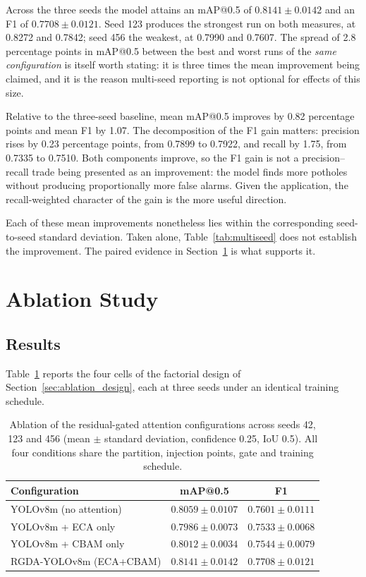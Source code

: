 \documentclass[MScCS]{uccthesis}
\begin{document}
Across the three seeds the model attains an mAP@0.5 of $0.8141 \pm 0.0142$ and
an F1 of $0.7708 \pm 0.0121$. Seed 123 produces the strongest run on both
measures, at 0.8272 and 0.7842; seed 456 the weakest, at 0.7990 and 0.7607. The
spread of 2.8 percentage points in mAP@0.5 between the best and worst runs of
the \emph{same configuration} is itself worth stating: it is three times the
mean improvement being claimed, and it is the reason multi-seed reporting is
not optional for effects of this size.

Relative to the three-seed baseline, mean mAP@0.5 improves by 0.82 percentage
points and mean F1 by 1.07. The decomposition of the F1 gain matters:
precision rises by 0.23 percentage points, from 0.7899 to 0.7922, and recall by
1.75, from 0.7335 to 0.7510. Both components improve, so the F1 gain is not a
precision--recall trade being presented as an improvement: the model finds
more potholes without producing proportionally more false alarms. Given the
application, the recall-weighted character of the gain is the more useful
direction.

Each of these mean improvements nonetheless lies within the corresponding
seed-to-seed standard deviation. Taken alone, Table~\ref{tab:multiseed} does
not establish the improvement. The paired evidence in
Section~\ref{sec:results_ablation} is what supports it.

\section{Ablation Study}
\label{sec:results_ablation}

\subsection{Results}

Table~\ref{tab:ablation} reports the four cells of the factorial design of
Section~\ref{sec:ablation_design}, each at three seeds under an identical
training schedule.

\begin{table}[tbp]
\centering
\small
\begin{tabular}{@{}lcc@{}}
\toprule
\textbf{Configuration} & \textbf{mAP@0.5} & \textbf{F1} \\
\midrule
YOLOv8m (no attention)  & $0.8059 \pm 0.0107$ & $0.7601 \pm 0.0111$ \\
YOLOv8m + ECA only      & $0.7986 \pm 0.0073$ & $0.7533 \pm 0.0068$ \\
YOLOv8m + CBAM only     & $0.8012 \pm 0.0034$ & $0.7544 \pm 0.0079$ \\
RGDA-YOLOv8m (ECA+CBAM) & $\mathbf{0.8141 \pm 0.0142}$ &
                          $\mathbf{0.7708 \pm 0.0121}$ \\
\bottomrule
\end{tabular}
\caption[Factorial ablation of the attention pathways.]
        {\label{tab:ablation}Ablation of the residual-gated attention
         configurations across seeds 42, 123 and 456 (mean $\pm$ standard
         deviation, confidence 0.25, IoU 0.5). All four conditions share the
         partition, injection points, gate and training schedule.}
\end{table}
\end{document}
